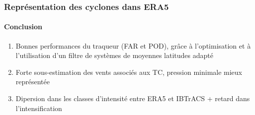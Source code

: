 \documentclass[aspectratio=169, usepdftitle=false, xcolor={dvipsnames}, 9pt,table]{beamer}
\begin{document}
 
 \begin{frame}[c]
     \frametitle{Représentation des cyclones dans ERA5}
     \framesubtitle{Conclusion}
     \begin{block}
         \small
         \begin{enumerate}
             \setlength\itemsep{1em}
             \item<1-> \alert{Bonnes performances} du traqueur (FAR et POD), grâce à l'optimisation et à l'utilisation d'un filtre de systèmes de
                 moyennes latitudes adapté
             \item<2-> Forte \alert{sous-estimation} des vents associés aux TC, pression minimale mieux représentée
             \item<3-> \alert{Dipersion} dans les classes d'intensité entre ERA5 et IBTrACS + \alert{retard} dans l'intensification
         \end{enumerate}
         \vspace{1em}
     \end{block}
 \end{frame}
 
\end{document}

